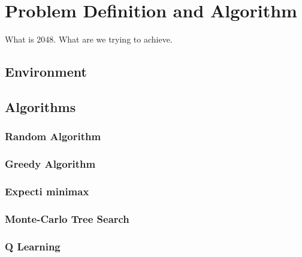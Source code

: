 \documentclass{svproc}
\begin{document}
    \section{Problem Definition and Algorithm}
   
  	 What is 2048. What are we trying to achieve.
    

    \subsection{Environment}
    
    \subsection{Algorithms}
    	\subsubsection{Random Algorithm}
    
    	\subsubsection{Greedy Algorithm}
    
		\subsubsection{Expecti minimax}    
    
    	\subsubsection{Monte-Carlo Tree Search}
    
    	\subsubsection{Q Learning}
		
\end{document}
